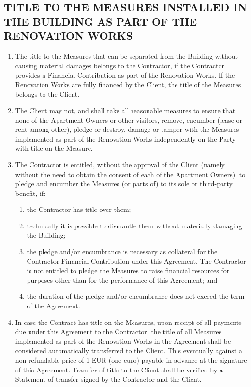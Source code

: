\begin{multicols}{2}
\subsection{TITLE TO THE MEASURES INSTALLED IN THE BUILDING AS PART OF THE RENOVATION WORKS}
\begin{enumerate}
	\item	The title to the Measures that can be separated from the Building without causing material damages belongs to the Contractor, if the Contractor provides a Financial Contribution as part of the Renovation Works. If the Renovation Works are fully financed by the Client, the title of the Measures belongs to the Client.
	\item	The Client may not, and shall take all reasonable measures to ensure that none of the Apartment Owners or other visitors, remove, encumber (lease or rent among other), pledge or destroy, damage or tamper with the Measures implemented as part of the Renovation Works independently on the Party with title on the Measure.
	\item	The Contractor is entitled, without the approval of the Client (namely without the need to obtain the consent of each of the Apartment Owners), to pledge and encumber the Measures (or parts of) to its sole or third-party benefit, if:
	\begin{enumerate}
		\item	the Contractor has title over them;
		\item	technically it is possible to dismantle them without materially damaging the Building;
		\item	the pledge and/or encumbrance is necessary as collateral for the Contractor Financial Contribution under this Agreement. The Contractor is not entitled to pledge the Measures to raise financial resources for purposes other than for the performance of this Agreement; and
		\item	the duration of the pledge and/or encumbrance does not exceed the term of the Agreement.
	\end{enumerate}
	\item In case the Contract has title on the Measures, upon receipt of all payments due under this Agreement to the Contractor, the title of all Measures implemented as part of the Renovation Works in the Agreement shall be considered automatically transferred to the Client. This eventually against a non-refundable price of 1 EUR (one euro) payable in advance at the signature of this Agreement. Transfer of title to the Client shall be verified by a Statement of transfer signed by the Contractor and the Client.
\end{enumerate}


\end{multicols}
